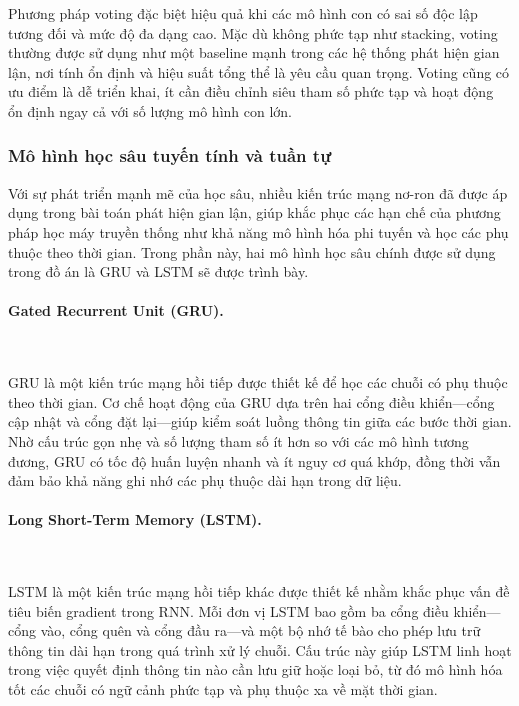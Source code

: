 Phương pháp voting đặc biệt hiệu quả khi các mô hình con có sai số độc lập tương đối và mức độ đa dạng cao. Mặc dù không phức tạp như stacking, voting thường được sử dụng như một baseline mạnh trong các hệ thống phát hiện gian lận, nơi tính ổn định và hiệu suất tổng thể là yêu cầu quan trọng. Voting cũng có ưu điểm là dễ triển khai, ít cần điều chỉnh siêu tham số phức tạp và hoạt động ổn định ngay cả với số lượng mô hình con lớn.

\subsubsection{Mô hình học sâu tuyến tính và tuần tự}

Với sự phát triển mạnh mẽ của học sâu, nhiều kiến trúc mạng nơ-ron đã được áp dụng trong bài toán phát hiện gian lận, giúp khắc phục các hạn chế của phương pháp học máy truyền thống như khả năng mô hình hóa phi tuyến và học các phụ thuộc theo thời gian. Trong phần này, hai mô hình học sâu chính được sử dụng trong đồ án là GRU và LSTM sẽ được trình bày.

\paragraph{Gated Recurrent Unit (GRU).}~

\vspace{0.5em}

GRU là một kiến trúc mạng hồi tiếp được thiết kế để học các chuỗi có phụ thuộc theo thời gian. Cơ chế hoạt động của GRU dựa trên hai cổng điều khiển—cổng cập nhật và cổng đặt lại—giúp kiểm soát luồng thông tin giữa các bước thời gian. Nhờ cấu trúc gọn nhẹ và số lượng tham số ít hơn so với các mô hình tương đương, GRU có tốc độ huấn luyện nhanh và ít nguy cơ quá khớp, đồng thời vẫn đảm bảo khả năng ghi nhớ các phụ thuộc dài hạn trong dữ liệu.

\paragraph{Long Short-Term Memory (LSTM).}~

\vspace{0.5em}

LSTM là một kiến trúc mạng hồi tiếp khác được thiết kế nhằm khắc phục vấn đề tiêu biến gradient trong RNN. Mỗi đơn vị LSTM bao gồm ba cổng điều khiển—cổng vào, cổng quên và cổng đầu ra—và một bộ nhớ tế bào cho phép lưu trữ thông tin dài hạn trong quá trình xử lý chuỗi. Cấu trúc này giúp LSTM linh hoạt trong việc quyết định thông tin nào cần lưu giữ hoặc loại bỏ, từ đó mô hình hóa tốt các chuỗi có ngữ cảnh phức tạp và phụ thuộc xa về mặt thời gian.

